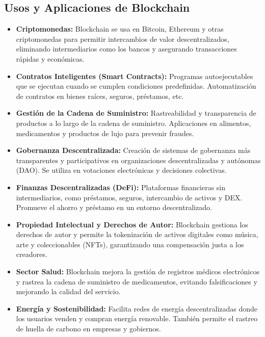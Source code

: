 \subsection{Usos y Aplicaciones de Blockchain}

\begin{itemize}
    \item \textbf{Criptomonedas:} Blockchain se usa en Bitcoin, Ethereum y otras criptomonedas para permitir intercambios de valor descentralizados, eliminando intermediarios como los bancos y asegurando transacciones rápidas y económicas.
    
    \item \textbf{Contratos Inteligentes (Smart Contracts):} Programas autoejecutables que se ejecutan cuando se cumplen condiciones predefinidas. Automatización de contratos en bienes raíces, seguros, préstamos, etc.
    
    \item \textbf{Gestión de la Cadena de Suministro:} Rastreabilidad y transparencia de productos a lo largo de la cadena de suministro. Aplicaciones en alimentos, medicamentos y productos de lujo para prevenir fraudes.
        
    \item \textbf{Gobernanza Descentralizada:} Creación de sistemas de gobernanza más transparentes y participativos en organizaciones descentralizadas y autónomas (DAO). Se utiliza en votaciones electrónicas y decisiones colectivas.
    
    \item \textbf{Finanzas Descentralizadas (DeFi):} Plataformas financieras sin intermediarios, como préstamos, seguros, intercambio de activos y DEX. Promueve el ahorro y préstamo en un entorno descentralizado.
    
    \item \textbf{Propiedad Intelectual y Derechos de Autor:} Blockchain gestiona los derechos de autor y permite la tokenización de activos digitales como música, arte y coleccionables (NFTs), garantizando una compensación justa a los creadores.
    
    \item \textbf{Sector Salud:} Blockchain mejora la gestión de registros médicos electrónicos y rastrea la cadena de suministro de medicamentos, evitando falsificaciones y mejorando la calidad del servicio.
    
    \item \textbf{Energía y Sostenibilidad:} Facilita redes de energía descentralizadas donde los usuarios venden y compran energía renovable. También permite el rastreo de huella de carbono en empresas y gobiernos.
    

\end{itemize}
